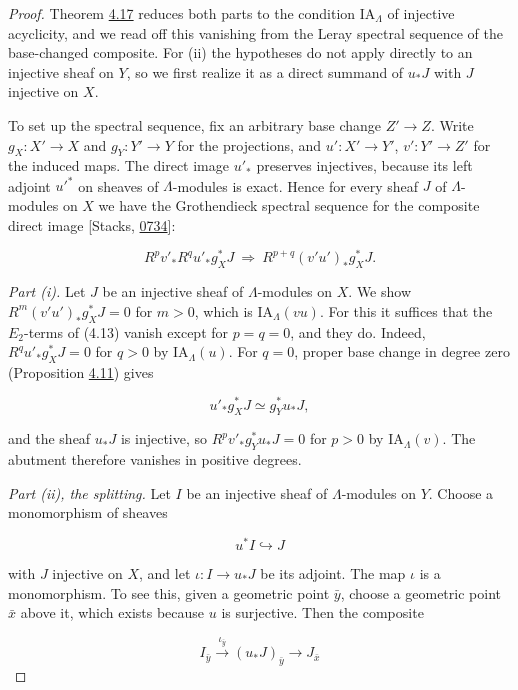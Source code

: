 \documentclass[11pt]{article}
\begin{document}
\begin{proof}[{Proof}]\label{bp86}%
Theorem \hyperref[bp45]{4.17} reduces both parts to the condition \(\mathrm{IA}_\Lambda\) of injective acyclicity, and we read off this vanishing from the Leray spectral sequence of the base-changed composite. For (ii) the hypotheses do not apply directly to an injective sheaf on \(Y\), so we first realize it as a direct summand of \(u_*J\) with \(J\) injective on \(X\).

To set up the spectral sequence, fix an arbitrary base change \(Z'\to Z\). Write \(g_X:X'\to X\) and \(g_Y:Y'\to Y\) for the projections, and \(u':X'\to Y'\), \(v':Y'\to Z'\) for the induced maps. The direct image \(u'_*\) preserves injectives, because its left adjoint \(u'^*\) on sheaves of \(\Lambda\)-modules is exact. Hence for every sheaf \(J\) of \(\Lambda\)-modules on \(X\) we have the Grothendieck spectral sequence for the composite direct image [Stacks, \href{https://stacks.math.columbia.edu/tag/0734}{0734}]:

\[
R^pv'_*R^qu'_*g_X^*J
\ \Longrightarrow\ R^{p+q}(v'u')_*g_X^*J.
\tag{4.13}
\]

\emph{Part (i).} Let \(J\) be an injective sheaf of \(\Lambda\)-modules on \(X\). We show \(R^m(v'u')_*g_X^*J=0\) for \(m>0\), which is \(\mathrm{IA}_\Lambda(vu)\). For this it suffices that the \(E_2\)-terms of (4.13) vanish except for \(p=q=0\), and they do. Indeed, \(R^qu'_*g_X^*J=0\) for \(q>0\) by \(\mathrm{IA}_\Lambda(u)\). For \(q=0\), proper base change in degree zero (Proposition \hyperref[bp30]{4.11}) gives

\[
u'_*g_X^*J\simeq g_Y^*u_*J,
\]

and the sheaf \(u_*J\) is injective, so \(R^pv'_*g_Y^*u_*J=0\) for \(p>0\) by \(\mathrm{IA}_\Lambda(v)\). The abutment therefore vanishes in positive degrees.

\emph{Part (ii), the splitting.} Let \(I\) be an injective sheaf of \(\Lambda\)-modules on \(Y\). Choose a monomorphism of sheaves

\[
u^*I\hookrightarrow J
\]

with \(J\) injective on \(X\), and let \(\iota:I\to u_*J\) be its adjoint. The map \(\iota\) is a monomorphism. To see this, given a geometric point \(\bar y\), choose a geometric point \(\bar x\) above it, which exists because \(u\) is surjective. Then the composite

\[
I_{\bar y}\xrightarrow{\iota_{\bar y}}(u_*J)_{\bar y}
\longrightarrow J_{\bar x}
\]


\end{proof}
\end{document}

